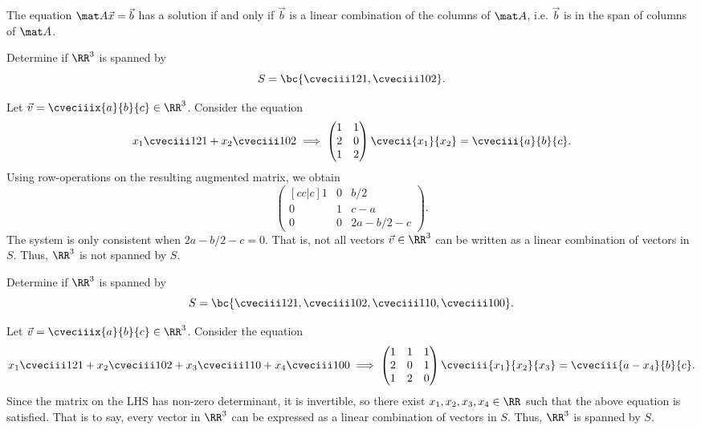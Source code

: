 \begin{proposition}
    The equation $\mat A \vec x = \vec b$ has a solution if and only if $\vec b$ is a linear combination of the columns of $\mat A$, i.e. $\vec b$ is in the span of columns of $\mat A$.
\end{proposition}

\begin{sample}
    Determine if $\RR^3$ is spanned by \[S = \bc{\cveciii121, \cveciii102}.\]
\end{sample}
\begin{sampans}
    Let $\vec v = \cveciiix{a}{b}{c} \in \RR^3$. Consider the equation \[x_1 \cveciii121 + x_2 \cveciii102 \implies \begin{pmatrix}1 & 1 \\ 2 & 0 \\ 1 & 2\end{pmatrix} \cvecii{x_1}{x_2} = \cveciii{a}{b}{c}.\] Using row-operations on the resulting augmented matrix, we obtain \[\begin{pmatrix}[cc|c]1 & 0 & b/2 \\ 0 & 1 & c-a \\ 0 & 0 & 2a - b/2 - c\end{pmatrix}.\] The system is only consistent when $2a - b/2 - c = 0$. That is, not all vectors $\vec v \in \RR^3$ can be written as a linear combination of vectors in $S$. Thus, $\RR^3$ is not spanned by $S$.
\end{sampans}

\begin{sample}
    Determine if $\RR^3$ is spanned by \[S = \bc{\cveciii121, \cveciii102, \cveciii110, \cveciii100}.\]
\end{sample}
\begin{sampans}
    Let $\vec v = \cveciiix{a}{b}{c} \in \RR^3$. Consider the equation \[x_1 \cveciii121 + x_2 \cveciii102 + x_3 \cveciii110 + x_4 \cveciii100 \implies \begin{pmatrix}1 & 1 & 1 \\ 2 & 0 & 1 \\ 1 & 2 & 0\end{pmatrix} \cveciii{x_1}{x_2}{x_3} = \cveciii{a-x_4}{b}{c}.\] Since the matrix on the LHS has non-zero determinant, it is invertible, so there exist $x_1, x_2, x_3, x_4 \in \RR$ such that the above equation is satisfied. That is to say, every vector in $\RR^3$ can be expressed as a linear combination of vectors in $S$. Thus, $\RR^3$ is spanned by $S$.
\end{sampans}

